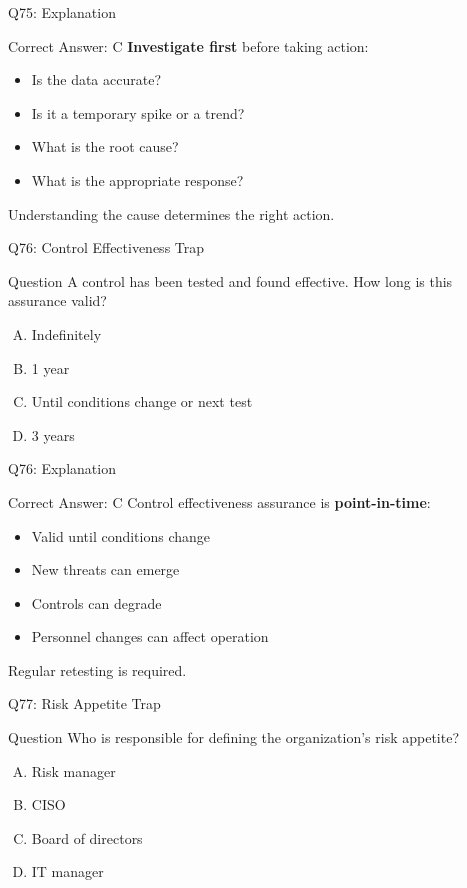 \documentclass{beamer}
\begin{document}
	\begin{frame}{Q75: Explanation}
		\begin{block}{Correct Answer: C}
			\textbf{Investigate first} before taking action:
			\begin{itemize}
				\item Is the data accurate?
				\item Is it a temporary spike or a trend?
				\item What is the root cause?
				\item What is the appropriate response?
			\end{itemize}
			Understanding the cause determines the right action.
		\end{block}
	\end{frame}
	
	
	\begin{frame}{Q76: Control Effectiveness Trap}
		\begin{block}{Question}
			A control has been tested and found effective. How long is this assurance valid?
		\end{block}
		\begin{enumerate}[(A)]
			\item Indefinitely
			\item 1 year
			\item Until conditions change or next test
			\item 3 years
		\end{enumerate}
	\end{frame}
	
	\begin{frame}{Q76: Explanation}
		\begin{block}{Correct Answer: C}
			Control effectiveness assurance is \textbf{point-in-time}:
			\begin{itemize}
				\item Valid until conditions change
				\item New threats can emerge
				\item Controls can degrade
				\item Personnel changes can affect operation
			\end{itemize}
			Regular retesting is required.
		\end{block}
	\end{frame}
	
	\begin{frame}{Q77: Risk Appetite Trap}
		\begin{block}{Question}
			Who is responsible for defining the organization's risk appetite?
		\end{block}
		\begin{enumerate}[(A)]
			\item Risk manager
			\item CISO
			\item Board of directors
			\item IT manager
		\end{enumerate}
	\end{frame}
	
\end{document}
